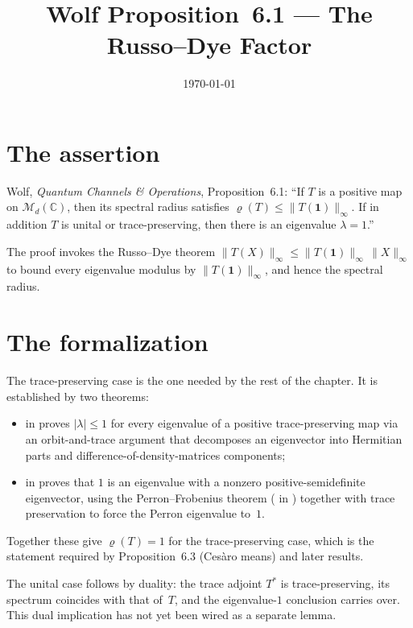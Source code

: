 \documentclass{article}
\title{Wolf Proposition~6.1 --- The Russo--Dye Factor}
\author{}
\date{\today}
\begin{document}
\maketitle
{}

\section{The assertion}

Wolf, \emph{Quantum Channels \& Operations}, Proposition~6.1:
``If $T$ is a positive map on $\mathcal M_d(\mathbb C)$, then its
spectral radius satisfies $\varrho(T)\le\|T(\mathbf 1)\|_\infty$.  If in
addition $T$ is unital or trace-preserving, then there is an eigenvalue
$\lambda=1$.''

The proof invokes the Russo--Dye theorem
$\|T(X)\|_\infty\le\|T(\mathbf 1)\|_\infty\,\|X\|_\infty$ to bound
every eigenvalue modulus by $\|T(\mathbf 1)\|_\infty$, and hence the
spectral radius.

\section{The formalization}

The trace-preserving case is the one needed by the rest of the chapter.
It is established by two theorems:
\begin{itemize}
\item {}
  in  proves $|\lambda|\le1$ for
  every eigenvalue of a positive trace-preserving map via an orbit-and-trace
  argument that decomposes an eigenvector into Hermitian parts and
  difference-of-density-matrices components;
\item {}
  in  proves that
  $1$ is an eigenvalue with a nonzero positive-semidefinite eigenvector,
  using the Perron--Frobenius theorem
  ( in
  ) together with trace
  preservation to force the Perron eigenvalue to~$1$.
\end{itemize}
Together these give $\varrho(T)=1$ for the trace-preserving case, which is the
statement required by Proposition~6.3 (Ces\`aro means) and later results.

The unital case follows by duality: the trace adjoint $T^*$ is
trace-preserving, its spectrum coincides with that of~$T$, and the
eigenvalue-$1$ conclusion carries over.  This dual implication has not yet been
wired as a separate lemma.
\end{document}
